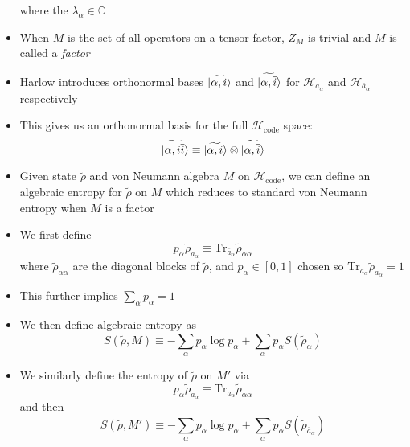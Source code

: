 \documentclass[12pt,a4paper]{article}
\numberwithin{equation}{section}
\newcommand{\Hcode}{\mathcal{H}_{\text{code}}}
\newcommand{\ol}[1]{\overline{#1}}
\theoremstyle{definition}
\theoremstyle{theorem}
\theoremstyle{example}
\begin{document}
\begin{itemize}
\begin{equation}
		\end{equation}
		where the $\lambda_{\alpha}\in\mathbb{C}$
		\item When $M$ is the set of all operators on a tensor factor, $Z_{M}$ is trivial and $M$ is called a \textit{factor}
		\item Harlow introduces orthonormal bases $\ket{\widetilde{\alpha,i}}$ and $\ket{\widetilde{\alpha,\ol{i}}}$ for $\mathcal{H}_{a_{\alpha}}$ and $\mathcal{H}_{\ol{a}_{\alpha}}$ respectively
		\item This gives us an orthonormal basis for the full $\Hcode$ space:
		\begin{equation}
			\ket{\widetilde{\alpha,i\ol{i}}}\equiv\ket{\widetilde{\alpha,i}}\otimes\ket{\widetilde{\alpha,\ol{i}}}
		\end{equation}
		\item Given state $\tilde{\rho}$ and von Neumann algebra $M$ on $\Hcode$, we can define an algebraic entropy for $\tilde{\rho}$ on $M$ which reduces to standard von Neumann entropy when $M$ is a factor
		\item We first define
		\begin{equation}
			p_{\alpha}\tilde{\rho}_{a_{\alpha}}\equiv\text{Tr}_{\ol{a}_{\alpha}}\tilde{\rho}_{\alpha\alpha}
		\end{equation}
		where $\tilde{\rho}_{\alpha\alpha}$ are the diagonal blocks of $\tilde{\rho}$, and $p_{\alpha}\in[0,1]$ chosen so $\text{Tr}_{a_{\alpha}}\tilde{\rho}_{a_{\alpha}}=1$
		\item This further implies $\sum_{\alpha} p_{\alpha}=1$
		\item We then define algebraic entropy as
		\begin{equation}
			S(\tilde{\rho},M)\equiv -\sum_{\alpha}p_{\alpha}\log{p_{\alpha}}+\sum_{\alpha}p_{\alpha}S(\tilde{\rho}_{\alpha})
		\end{equation}
		\item We similarly define the entropy of $\tilde{\rho}$ on $M'$ via
		\begin{equation}
			p_{\alpha}\tilde{\rho}_{\ol{a}_{\alpha}}\equiv\text{Tr}_{a_{\alpha}}\tilde{\rho}_{\alpha\alpha}
		\end{equation}
		and then
		\begin{equation}
			S(\tilde{\rho},M')\equiv-\sum_{\alpha}p_{\alpha}\log{p_{\alpha}}+\sum_{\alpha}p_{\alpha}S(\tilde{\rho}_{\ol{a}_{\alpha}})
		\end{equation}
	\end{itemize}
\end{document}

